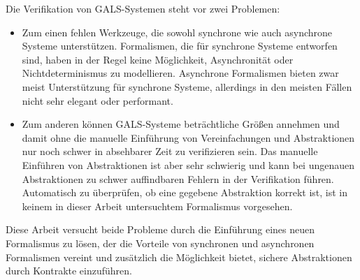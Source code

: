Die Verifikation von GALS-Systemen steht vor zwei Problemen:
\begin{itemize}
\item Zum einen fehlen Werkzeuge, die sowohl synchrone wie auch asynchrone Systeme unterstützen.
  Formalismen, die für synchrone Systeme entworfen sind, haben in der Regel keine Möglichkeit, Asynchronität oder Nichtdeterminismus zu modellieren.
  Asynchrone Formalismen bieten zwar meist Unterstützung für synchrone Systeme, allerdings in den meisten Fällen nicht sehr elegant oder performant.
\item Zum anderen können GALS-Systeme beträchtliche Größen annehmen und damit ohne die manuelle Einführung von Vereinfachungen und Abstraktionen nur noch schwer in absehbarer Zeit zu verifizieren sein.
  Das manuelle Einführen von Abstraktionen ist aber sehr schwierig und kann bei ungenauen Abstraktionen zu schwer auffindbaren Fehlern in der Verifikation führen.
  Automatisch zu überprüfen, ob eine gegebene Abstraktion korrekt ist, ist in keinem in dieser Arbeit untersuchtem Formalismus vorgesehen.
\end{itemize}
Diese Arbeit versucht beide Probleme durch die Einführung eines neuen Formalismus zu lösen, der die Vorteile von synchronen und asynchronen Formalismen vereint und zusätzlich die Möglichkeit bietet, sichere Abstraktionen durch Kontrakte einzuführen.

